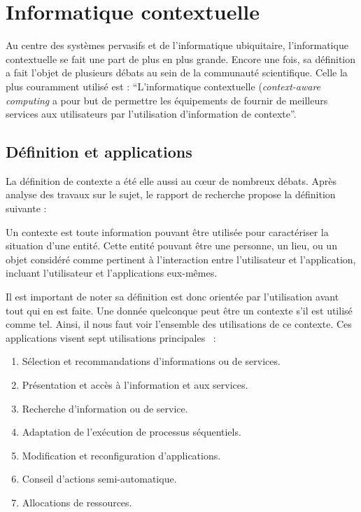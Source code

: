 \section{Informatique contextuelle}\label{sec:rw:supervision:contexte}
Au centre des systèmes pervasifs et de l'informatique ubiquitaire, l'informatique contextuelle se fait une part de plus en plus grande. Encore une fois, sa définition a fait l'objet de plusieurs débats au sein de la communauté scientifique. Celle la plus couramment utilisé est : \enquote{L'informatique contextuelle (\textit{context-aware computing} a pour but de permettre les équipements de fournir de meilleurs services aux utilisateurs par l'utilisation d'information de contexte}\cite{Han:contextaware}.

\subsection{Définition et applications}
La définition de contexte a été elle aussi au cœur de nombreux débats. Après analyse des travaux sur le sujet, le rapport de recherche \cite{Dey:context} propose la définition suivante :

\begin{defi}[Contexte]
Un contexte est toute information pouvant être utilisée pour caractériser la situation d'une entité. Cette entité pouvant être une personne, un lieu, ou un objet considéré comme pertinent à l'interaction entre l'utilisateur et l'application, incluant l'utilisateur et l'applications eux-mêmes.
\end{defi}

Il est important de noter sa définition est donc orientée par l'utilisation avant tout qui en est faite. Une donnée quelconque peut être un contexte s'il est utilisé comme tel. Ainsi, il nous faut voir l'ensemble des utilisations de ce contexte. Ces applications visent sept utilisations principales~\cite{Soylu:context} : 
\begin{enumerate}
	\item Sélection et recommandations d'informations ou de services.
	\item Présentation et accès à l'information et aux services.
	\item Recherche d'information ou de service.
	\item Adaptation de l'exécution de processus séquentiels.
	\item Modification et reconfiguration d'applications.
	\item Conseil d'actions semi-automatique.
	\item Allocations de ressources.
\end{enumerate}

